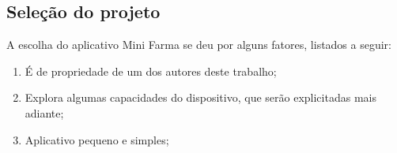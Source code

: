 \subsection{Seleção do projeto} \label{subsec:selecaodoprojeto}

A escolha do aplicativo Mini Farma se deu por alguns fatores, listados a seguir:

\begin{enumerate}
    \item É de propriedade de um dos autores deste trabalho;
    \item Explora algumas capacidades do dispositivo, que serão explicitadas mais adiante;
    \item Aplicativo pequeno e simples;
\end{enumerate}
 